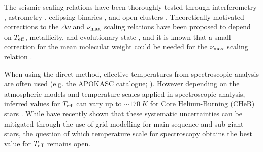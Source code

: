 \documentclass[fleqn,usenatbib]{mnras}
\newcommand{\numax}{\mbox{$\nu_{\rm max}$}\xspace}
\newcommand{\dnu}{\mbox{$\Delta \nu$}\xspace}
\newcommand{\teff}{\mbox{$T_{\rm eff}$}\xspace}
\newcommand{\new}[1]{#1}
\newcommand{\nnew}[1]{#1}
\newcommand{\up}[1]{#1}
\begin{document}
The seismic scaling relations have been thoroughly tested through interferometry \citep{art:white+2013}, astrometry \citep{art:huber+2017}, eclipsing binaries \citep{art:gaulme+2016}, and open clusters \citep{art:miglio+2012}. Theoretically motivated corrections to the \dnu and \numax scaling relations have been proposed to depend on \teff, metallicity, and evolutionary state \citep{art:miglio+2012,art:sharma+2016}, and it is known that a small correction for the mean molecular weight could be needed for the \numax scaling relation \citep{art:belkacem+2013, art:viani+2017}. 


When using the direct method, effective temperatures from spectroscopic analysis are often used (e.g. the APOKASC catalogue; \cite{art:pinsonneault+2014,art:pinsonneault+2018}). However depending on the atmospheric models and temperature scales applied in spectroscopic analysis, inferred values for \teff can vary up to $\sim170\ K$ for Core Helium-Burning (CHeB) stars \citep{art:slumstrup+2018}. While \cite{art:bellinger+2018} have recently shown that these systematic uncertainties can be mitigated through the use of grid modelling for main-sequence and sub-giant stars, the question of which temperature scale for spectroscopy obtains the best value for \teff remains open.\\
\end{document}
